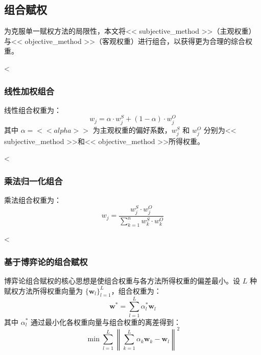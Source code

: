 
\subsection{组合赋权}

为克服单一赋权方法的局限性，本文将<< subjective_method >>（主观权重）与<< objective_method >>（客观权重）进行组合，以获得更为合理的综合权重。

<%
\subsubsection{线性加权组合}

线性组合权重为：
\begin{equation}
    w_j = \alpha \cdot w_j^{S} + (1 - \alpha) \cdot w_j^{O}
    \label{eq:comb_linear}
\end{equation}
其中 $\alpha = << alpha >>$ 为主观权重的偏好系数，$w_j^S$ 和 $w_j^O$ 分别为<< subjective_method >>和<< objective_method >>所得权重。

<%
\subsubsection{乘法归一化组合}

乘法组合权重为：
\begin{equation}
    w_j = \frac{w_j^S \cdot w_j^O}{\sum_{k=1}^{n} w_k^S \cdot w_k^O}
    \label{eq:comb_multiplicative}
\end{equation}

<%
\subsubsection{基于博弈论的组合赋权}

博弈论组合赋权的核心思想是使组合权重与各方法所得权重的偏差最小。设 $L$ 种赋权方法所得权重向量为 $\{\mathbf{w}_l\}_{l=1}^{L}$，组合权重为：
\begin{equation}
    \mathbf{w}^* = \sum_{l=1}^{L} \alpha_l^* \mathbf{w}_l
\end{equation}
其中 $\alpha_l^*$ 通过最小化各权重向量与组合权重的离差得到：
\begin{equation}
    \min \sum_{l=1}^{L} \left\| \sum_{k=1}^{L} \alpha_k \mathbf{w}_k - \mathbf{w}_l \right\|^2
\end{equation}

